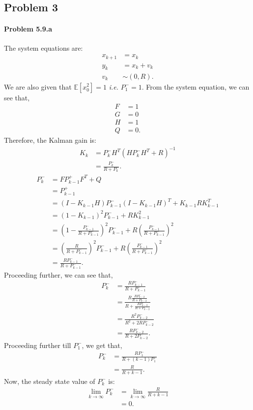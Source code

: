 \subsection*{Problem 3}
\paragraph{Problem 5.9.a}The system equations are:
\begin{align*}
	x_{k+1} &= x_k\\
	y_k &= x_k + v_k\\
	v_k &\sim (0, R).
\end{align*}
We are also given that $\mathbb{E}[x_0^2] = 1$ \textit{i.e.} $P_1^- = 1$. From the system equation, we can see that,
\begin{align*}
	F &= 1\\
	G &= 0\\
	H &= 1\\
	Q &= 0.
\end{align*}
Therefore, the Kalman gain is:
\begin{align*}
	K_k &= P_k^-H^T(HP_k^-H^T+R)^{-1}\\
	&= \frac{P_k^-}{R+P_k^-}.
\end{align*}
\begin{align}\label{eq:q3_one_step_sol}
	P_k^- &= FP_{k-1}^+F^T + Q \nonumber\\
	&= P_{k-1}^+\nonumber\\
	&= (I-K_{k-1}H)P_{k-1}^-(I-K_{k-1}H)^T+K_{k-1}RK_{k-1}^T \nonumber\\
	&= (1-K_{k-1})^2P_{k-1}^- + RK_{k-1}^2 \nonumber\\
	&= \left(1-\frac{P_{k-1}^-}{R+P_{k-1}^-}\right)^2P_{k-1}^- + R\left(\frac{P_{k-1}^-}{R+P_{k-1}^-}\right)^2 \nonumber\\
	&= \left(\frac{R}{R+P_{k-1}^-}\right)^2P_{k-1}^- + R\left(\frac{P_{k-1}^-}{R+P_{k-1}^-}\right)^2\nonumber\\
	&= \frac{RP_{k-1}^-}{R+P_{k-1}^-}.
\end{align}
Proceeding further, we can see that,
\begin{align*}
	P_k^- &= \frac{RP_{k-1}^-}{R+P_{k-1}^-}\\
	&= \frac{R\frac{RP_{k-2}^-}{R+P_{k-2}^-}}{R+\frac{RP_{k-2}^-}{R+P_{k-2}^-}}\\
	&= \frac{R^2P_{k-2}^-}{R^2+2RP_{k-2}^-}\\
	&= \frac{RP_{k-2}^-}{R+2P_{k-2}^-}.
\end{align*}
Proceeding further till $P_1^-$, we get that,
\begin{align*}
	P_k^- &= \frac{RP_1^-}{R+(k-1)P_1^-}\\
	&= \frac{R}{R+k-1}.
\end{align*}
Now, the steady state value of $P_k^-$ is:
\begin{align*}
	\lim_{k \to \infty} P_k^- &= \lim_{k \to \infty} \frac{R}{R+k-1}\\
	&= 0.
\end{align*}
